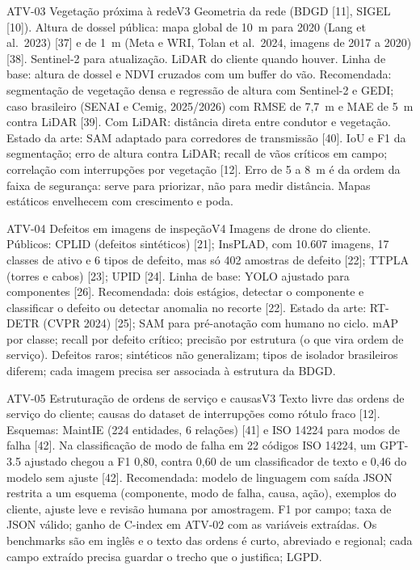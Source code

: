 \begin{ficha}{ATV-03 \textperiodcentered{} Vegetação próxima à rede}{V3}
 Geometria da rede (BDGD [11], SIGEL [10]). Altura de dossel
pública: mapa global de 10~m para 2020 (Lang et al.\ 2023) [37] e de 1~m
(Meta e WRI, Tolan et al.\ 2024, imagens de 2017 a 2020) [38]. Sentinel-2
para atualização. LiDAR do cliente quando houver.
 Linha de base: altura de dossel e NDVI cruzados com um
buffer do vão. Recomendada: segmentação de vegetação densa e regressão de
altura com Sentinel-2 e GEDI; caso brasileiro (SENAI e Cemig, 2025/2026) com
RMSE de 7,7~m e MAE de 5~m contra LiDAR [39]. Com LiDAR: distância direta
entre condutor e vegetação. Estado da arte: SAM adaptado para corredores de
transmissão [40].
 IoU e F1 da segmentação; erro de altura contra LiDAR; recall
de vãos críticos em campo; correlação com interrupções por vegetação [12].
 Erro de 5 a 8~m é da ordem da faixa de segurança: serve
para priorizar, não para medir distância. Mapas estáticos envelhecem com
crescimento e poda.
\end{ficha}

\begin{ficha}{ATV-04 \textperiodcentered{} Defeitos em imagens de inspeção}{V4}
 Imagens de drone do cliente. Públicos: CPLID (defeitos
sintéticos) [21]; InsPLAD, com 10.607 imagens, 17 classes de ativo e 6 tipos
de defeito, mas só 402 amostras de defeito [22]; TTPLA (torres e cabos) [23];
UPID [24].
 Linha de base: YOLO ajustado para componentes [26].
Recomendada: dois estágios, detectar o componente e classificar o defeito ou
detectar anomalia no recorte [22]. Estado da arte: RT-DETR (CVPR 2024) [25];
SAM para pré-anotação com humano no ciclo.
 mAP por classe; recall por defeito crítico; precisão por
estrutura (o que vira ordem de serviço).
 Defeitos raros; sintéticos não generalizam; tipos de
isolador brasileiros diferem; cada imagem precisa ser associada à estrutura
da BDGD.
\end{ficha}

\begin{ficha}{ATV-05 \textperiodcentered{} Estruturação de ordens de serviço e causas}{V3}
 Texto livre das ordens de serviço do cliente; causas do dataset
de interrupções como rótulo fraco [12]. Esquemas: MaintIE (224 entidades, 6
relações) [41] e ISO 14224 para modos de falha [42].
 Na classificação de modo de falha em 22 códigos ISO 14224,
um GPT-3.5 ajustado chegou a F1 0,80, contra 0,60 de um classificador de
texto e 0,46 do modelo sem ajuste [42]. Recomendada: modelo de linguagem com
saída JSON restrita a um esquema (componente, modo de falha, causa, ação),
exemplos do cliente, ajuste leve e revisão humana por amostragem.
 F1 por campo; taxa de JSON válido; ganho de C-index em ATV-02
com as variáveis extraídas.
 Os benchmarks são em inglês e o texto das ordens é curto,
abreviado e regional; cada campo extraído precisa guardar o trecho que o
justifica; LGPD.
\end{ficha}

